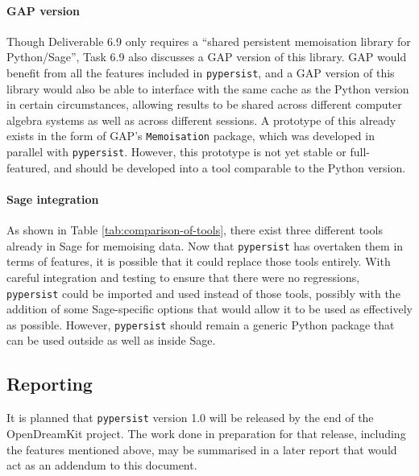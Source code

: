 \documentclass{deliverablereport}
\newcommand{\pypersist}{\texttt{pypersist}}
\begin{document}
\paragraph{GAP version}
Though Deliverable 6.9 only requires a ``shared persistent memoisation library
for Python/Sage'', Task 6.9 also discusses a GAP version of this library.  GAP
would benefit from all the features included in \pypersist{}, and a GAP version
of this library would also be able to interface with the same cache as the
Python version in certain circumstances, allowing results to be shared across
different computer algebra systems as well as across different sessions.  A
prototype of this already exists in the form of GAP's \texttt{Memoisation}
package, which was developed in parallel with \pypersist{}.  However, this
prototype is not yet stable or full-featured, and should be developed into a
tool comparable to the Python version.

\paragraph{Sage integration}
As shown in Table \ref{tab:comparison-of-tools}, there exist three different
tools already in Sage for memoising data.  Now that \pypersist{} has overtaken
them in terms of features, it is possible that it could replace those tools
entirely.  With careful integration and testing to ensure that there were no
regressions, \pypersist{} could be imported and used instead of those tools,
possibly with the addition of some Sage-specific options that would allow it to
be used as effectively as possible.  However, \pypersist{} should remain a
generic Python package that can be used outside as well as inside Sage.

\subsection{Reporting}
It is planned that \pypersist{} version 1.0 will be released by the end of the
OpenDreamKit project.  The work done in preparation for that release, including
the features mentioned above, may be summarised in a later report that would act
as an addendum to this document.
\end{document}
